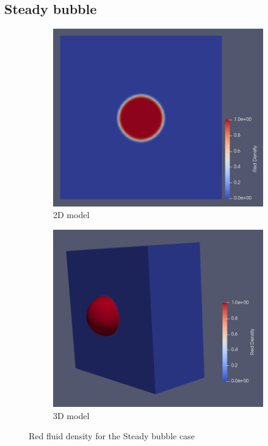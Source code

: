 \documentclass[12pt, openany]{book}
\begin{document}
\subsection{Steady bubble} 
\begin{figure}[H]
	\centering
	\begin{subfigure}{.49\textwidth}
		\includegraphics[width=\linewidth]{Resources/Images/steadyBubble.png}
		\caption{2D model}
	\end{subfigure}
	\begin{subfigure}{.49\textwidth}
		\includegraphics[width=\linewidth]{Resources/Images/steadyBubble3d.png}
		\caption{3D model}
	\end{subfigure} 
	\caption{Red fluid density for the Steady bubble case}
	\label{fig:steady}
\end{figure} 
\end{document}
